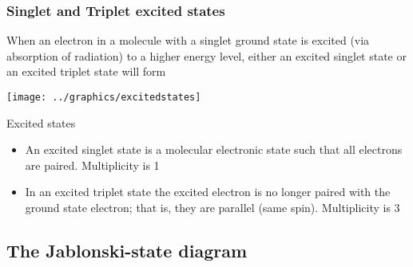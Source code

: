\documentclass[a4paper,12pt,titlepage]{article}
\begin{document}
\begin{frame}
	\frametitle{Singlet and Triplet excited states}
	When an electron in a molecule with a singlet ground state is excited (via absorption of radiation) to a higher energy level, 		either an excited singlet state or an excited triplet state will form
	\begin{center}
	\texttt{[image: ../graphics/excitedstates]}
	\end{center}
\end{frame}

\begin{frame}
	\begin{alertblock}{Excited states}
	\begin{itemize}
		\item An excited singlet state is a molecular electronic state such that all electrons are paired. Multiplicity is 1
		\item In an excited triplet state the excited electron is no longer paired with the ground state electron; that is, they are 			  parallel (same spin). Multiplicity is 3
	\end{itemize}
	\end{alertblock}
\end{frame}

\subsection{The Jablonski-state diagram}
\end{document}
